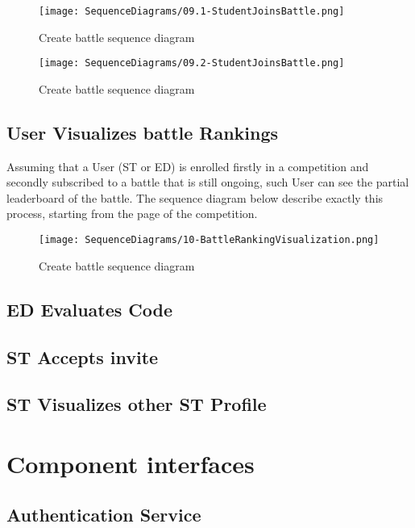 \begin{figure}[H]
  \centering
  \texttt{[image: SequenceDiagrams/09.1-StudentJoinsBattle.png]}
  \caption{Create battle sequence diagram}
  \label{fig:st_joins_battle_1}
\end{figure}

\begin{figure}[H]
  \centering
  \texttt{[image: SequenceDiagrams/09.2-StudentJoinsBattle.png]}
  \caption{Create battle sequence diagram}
  \label{fig:st_joins_battle_2}
\end{figure}

\subsection*{User Visualizes battle Rankings}
Assuming that a User (ST or ED) is enrolled firstly in a competition and secondly subscribed to a battle that is still ongoing, such User can see the partial leaderboard of the battle. The sequence diagram below describe exactly this process, starting from the page of the competition. 
\begin{figure}[H]
  \centering
  \texttt{[image: SequenceDiagrams/10-BattleRankingVisualization.png]}
  \caption{Create battle sequence diagram}
  \label{fig:user_visualize_rankings}
\end{figure}

\subsection*{ED Evaluates Code}

\subsection*{ST Accepts invite}

\subsection*{ST Visualizes other ST Profile}

\section{Component interfaces}
\label{s:component-interfaces}%


\subsection{Authentication Service}
